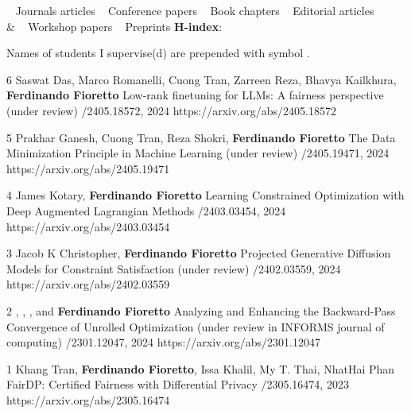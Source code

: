 
\begin{keywords}
{			 \faAngleRight~  Journals articles
\hspace{4pt} \faAngleRight~  Conference papers
\hspace{4pt} \faAngleRight~  Book chapters
\hspace{4pt} \faAngleRight~  Editorial articles
		 \\& \faAngleRight~  Workshop papers
\hspace{4pt} \faAngleRight~  Preprints
}
{\citNo \hspace{8pt} 
 \textbf{H-index}: \hIndex \hspace{8pt} 
 }%
\end{keywords}

Names of students I supervise(d) are prepended with symbol \student{}.

\begin{pubs}

\wsentry
	{6}
	{\student{} Saswat Das,  Marco Romanelli, \student{} Cuong Tran, \student{} Zarreen Reza, 
	Bhavya Kailkhura, {\bf Ferdinando Fioretto}}
	{Low-rank finetuning for LLMs: A fairness perspective}
	{(under review) /2405.18572, 2024}
	{https://arxiv.org/abs/2405.18572}

\wsentry
	{5}
	{Prakhar Ganesh, \student{} Cuong Tran, Reza Shokri, {\bf Ferdinando Fioretto}}
	{The Data Minimization Principle in Machine Learning}
	{(under review) /2405.19471, 2024}
	{https://arxiv.org/abs/2405.19471}

\wsentry
	{4}
	{\student{} James Kotary, {\bf Ferdinando Fioretto}}
	{Learning Constrained Optimization with Deep Augmented Lagrangian Methods}
	{/2403.03454, 2024}
	{https://arxiv.org/abs/2403.03454}

\wsentry
	{3}
	{\student{} Jacob K Christopher, {\bf Ferdinando Fioretto}}
  	{Projected Generative Diffusion Models for Constraint Satisfaction}
	{(under review) /2402.03559, 2024}
	{https://arxiv.org/abs/2402.03559}

\wsentry
	{2}
	{, , ,
	and {\bf Ferdinando Fioretto}}
	{Analyzing and Enhancing the Backward-Pass Convergence of Unrolled Optimization}	
	{(under review in INFORMS journal of computing) /2301.12047, 2024}
	{https://arxiv.org/abs/2301.12047}

\wsentry
	{1}
	{Khang Tran, {\bf Ferdinando Fioretto}, Issa Khalil, My T. Thai, NhatHai Phan} 
	{FairDP: Certified Fairness with Differential Privacy}
	{/2305.16474, 2023}
	{https://arxiv.org/abs/2305.16474}
\end{pubs}

